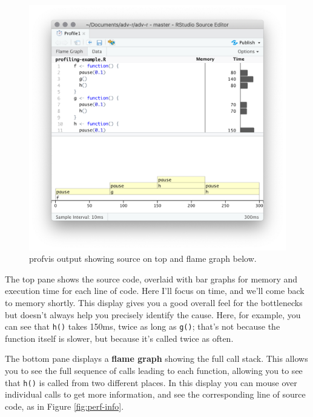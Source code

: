 \documentclass[]{book}
\begin{document}
\begin{figure}

{\centering \includegraphics[width=1\linewidth]{screenshots/performance/flamegraph} 

}

\caption{profvis output showing source on top and flame graph below.}\label{fig:flamegraph}
\end{figure}

The top pane shows the source code, overlaid with bar graphs for memory and execution time for each line of code. Here I'll focus on time, and we'll come back to memory shortly. This display gives you a good overall feel for the bottlenecks but doesn't always help you precisely identify the cause. Here, for example, you can see that \texttt{h()} takes 150ms, twice as long as \texttt{g()}; that's not because the function itself is slower, but because it's called twice as often.

The bottom pane displays a \textbf{flame graph} showing the full call stack. This allows you to see the full sequence of calls leading to each function, allowing you to see that \texttt{h()} is called from two different places. In this display you can mouse over individual calls to get more information, and see the corresponding line of source code, as in Figure \ref{fig:perf-info}.
\end{document}

